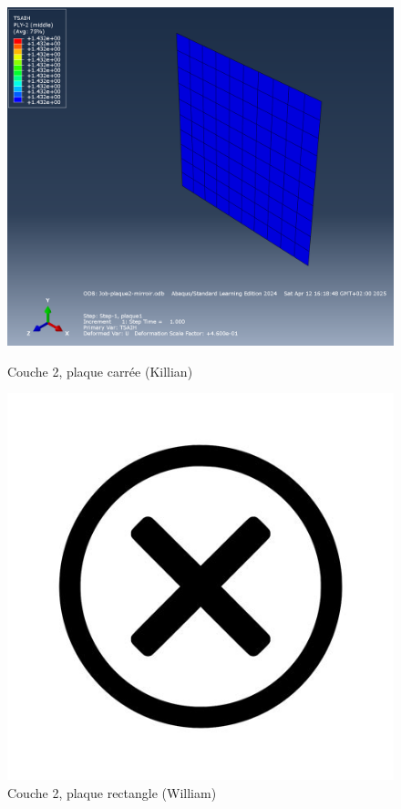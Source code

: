 \documentclass[a4paper,12pt]{article}
\begin{document}
\begin{figure}[H]
	\centering
	\begin{minipage}[t][0.3\textheight]{0.495\textwidth}
		\centering
		\includegraphics[width=\textwidth]{media/K_P2_L2-7_12042025.png} %
		\caption{Couche 2, plaque carrée (Killian)}
		\label{fig:image1}
	\end{minipage}
	\hfill
	\begin{minipage}[t][0.3\textheight]{0.495\textwidth}
		\centering
		\includegraphics[width=\textwidth]{media/no-image.jpg} %
		\caption{Couche 2, plaque rectangle (William)}
		\label{fig:image2}
	\end{minipage}
\end{figure}
\end{document}
